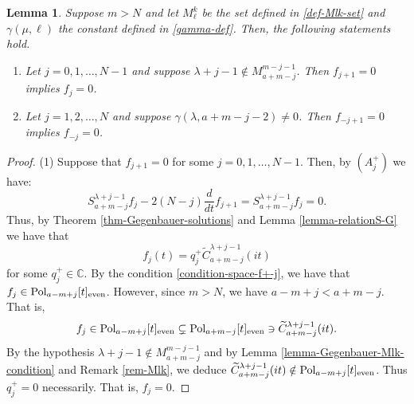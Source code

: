 \documentclass[12pt, pdflatex, a4paper]{article}
\theoremstyle{plain}
\newtheorem{lemma}[thm]{Lemma}
\theoremstyle{definition}
\def\C{{\mathbb C}}
\def\Geg{\widetilde{C}}
\def\Pol{\text{\normalfont{Pol}}}
\begin{document}
\begin{lemma}\label{lemma-fj=0-implies-fj-1=0}
Suppose $m >N$ and let $M_\ell^k$ be the set defined in \eqref{def-Mlk-set} and $\gamma(\mu, \ell)$ the constant defined in \eqref{gamma-def}. Then, the following statements hold.
\begin{enumerate}[label=\normalfont{(\arabic*)}, topsep=0pt]
\item Let $j=0, 1, \ldots, N-1$ and suppose $\lambda+j-1 \notin M_{a+m-j}^{m-j-1}$. Then $f_{j+1} = 0$ implies $f_j = 0$. 
\item Let $j = 1, 2, \ldots, N$ and suppose $\gamma(\lambda, a+m-j-2) \neq 0$. Then $f_{-j+1} = 0$ implies $f_{-j} = 0$.
\end{enumerate}
\end{lemma}
\begin{proof}
(1) Suppose that $f_{j+1} = 0$ for some $j = 0, 1, \dots, N-1$. Then, by $(A_j^+)$ we have:
\begin{equation*}
S_{a+m-j}^{\lambda+j-1} f_j - 2(N-j) \frac{d}{dt}f_{j+1} = S_{a+m-j}^{\lambda+j-1} f_j = 0.
\end{equation*}
Thus, by Theorem \ref{thm-Gegenbauer-solutions} and Lemma \ref{lemma-relationS-G} we have that
\begin{equation*}
f_j(t) = q_j^+\Geg_{a+m-j}^{\lambda+j-1}(it)
\end{equation*}
for some $q_j^+ \in \C$. By the condition \eqref{condition-space-f+-j}, we have that $f_j \in \Pol_{a-m+j}[t]_\text{even}$. However, since $m>N$, we have $a-m+j < a+m-j$. That is,
\begin{equation*}
f_j \in \Pol_{a-m+j}[t]_\text{even} \subsetneq \Pol_{a+m-j}[t]_\text{even} \ni \Geg_{a+m-j}^{\lambda+j-1}(it).
\end{equation*}
By the hypothesis $\lambda+j-1 \notin M_{a+m-j}^{m-j-1}$ and by Lemma \ref{lemma-Gegenbauer-Mlk-condition} and Remark \ref{rem-Mlk}, we deduce $\Geg_{a+m-j}^{\lambda+j-1}(it) \notin \Pol_{a-m+j}[t]_\text{even}$. Thus $q_j^+ = 0$ necessarily. That is, $f_j = 0$.


\end{proof}
\end{document}

